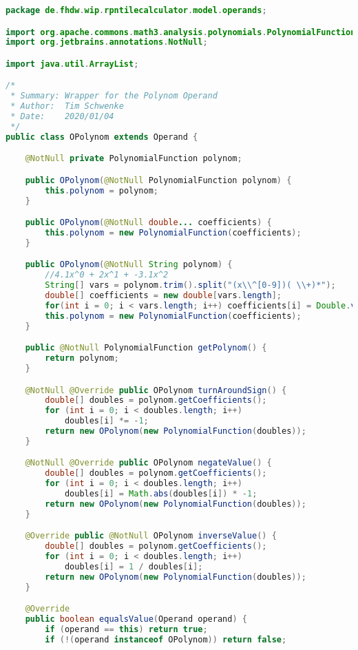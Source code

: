 \begin{lstlisting}[caption=OPolynom (Schwenke),label=list:OPolynom,language=Java]
package de.fhdw.wip.rpntilecalculator.model.operands;

import org.apache.commons.math3.analysis.polynomials.PolynomialFunction;
import org.jetbrains.annotations.NotNull;

import java.util.ArrayList;

/*
 * Summary: Wrapper for the Polynom Operand
 * Author:  Tim Schwenke
 * Date:    2020/01/04
 */
public class OPolynom extends Operand {

    @NotNull private PolynomialFunction polynom;

    public OPolynom(@NotNull PolynomialFunction polynom) {
        this.polynom = polynom;
    }

    public OPolynom(@NotNull double... coefficients) {
        this.polynom = new PolynomialFunction(coefficients);
    }

    public OPolynom(@NotNull String polynom) {
        //4.1x^0 + 2x^1 + -3.1x^2
        String[] vars = polynom.trim().split("(x\\^[0-9])( \\+)*");
        double[] coefficients = new double[vars.length];
        for(int i = 0; i < vars.length; i++) coefficients[i] = Double.valueOf(vars[i].trim());
        this.polynom = new PolynomialFunction(coefficients);
    }

    public @NotNull PolynomialFunction getPolynom() {
        return polynom;
    }

    @NotNull @Override public OPolynom turnAroundSign() {
        double[] doubles = polynom.getCoefficients();
        for (int i = 0; i < doubles.length; i++)
            doubles[i] *= -1;
        return new OPolynom(new PolynomialFunction(doubles));
    }

    @NotNull @Override public OPolynom negateValue() {
        double[] doubles = polynom.getCoefficients();
        for (int i = 0; i < doubles.length; i++)
            doubles[i] = Math.abs(doubles[i]) * -1;
        return new OPolynom(new PolynomialFunction(doubles));
    }

    @Override public @NotNull OPolynom inverseValue() {
        double[] doubles = polynom.getCoefficients();
        for (int i = 0; i < doubles.length; i++)
            doubles[i] = 1 / doubles[i];
        return new OPolynom(new PolynomialFunction(doubles));
    }

    @Override
    public boolean equalsValue(Operand operand) {
        if (operand == this) return true;
        if (!(operand instanceof OPolynom)) return false;


\end{lstlisting}
